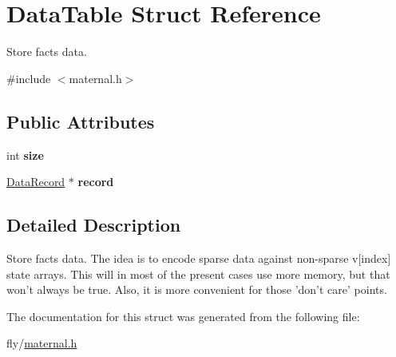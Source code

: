 \hypertarget{structDataTable}{
\section{DataTable Struct Reference}
\label{structDataTable}
}


Store facts data.  


{\ttfamily \#include $<$maternal.h$>$}\subsection*{Public Attributes}
\begin{DoxyCompactItemize}
\item 
\hypertarget{structDataTable_add9482e1644e4f41faf1a52d6a70aece}{
int {\bfseries size}}
\label{structDataTable_add9482e1644e4f41faf1a52d6a70aece}

\item 
\hypertarget{structDataTable_a5edd68afca8929ccb90e7bd95c25b13b}{
\hyperlink{structDataRecord}{DataRecord} $\ast$ {\bfseries record}}
\label{structDataTable_a5edd68afca8929ccb90e7bd95c25b13b}

\end{DoxyCompactItemize}


\subsection{Detailed Description}
Store facts data. The idea is to encode sparse data against non-\/sparse v\mbox{[}index\mbox{]} state arrays. This will in most of the present cases use more memory, but that won't always be true. Also, it is more convenient for those 'don't care' points. 

The documentation for this struct was generated from the following file:\begin{DoxyCompactItemize}
\item 
fly/\hyperlink{maternal_8h}{maternal.h}\end{DoxyCompactItemize}
